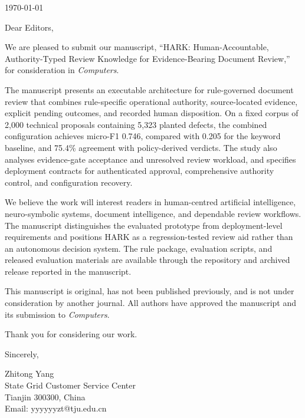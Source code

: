 \documentclass[11pt]{article}
\begin{document}
\thispagestyle{empty}

\today

Dear Editors,

We are pleased to submit our manuscript, ``HARK: Human-Accountable, Authority-Typed Review Knowledge for Evidence-Bearing Document Review,'' for consideration in \emph{Computers}.

The manuscript presents an executable architecture for rule-governed document review that combines rule-specific operational authority, source-located evidence, explicit pending outcomes, and recorded human disposition. On a fixed corpus of 2,000 technical proposals containing 5,323 planted defects, the combined configuration achieves micro-F1 0.746, compared with 0.205 for the keyword baseline, and 75.4\% agreement with policy-derived verdicts. The study also analyses evidence-gate acceptance and unresolved review workload, and specifies deployment contracts for authenticated approval, comprehensive authority control, and configuration recovery.

We believe the work will interest readers in human-centred artificial intelligence, neuro-symbolic systems, document intelligence, and dependable review workflows. The manuscript distinguishes the evaluated prototype from deployment-level requirements and positions HARK as a regression-tested review aid rather than an autonomous decision system. The rule package, evaluation scripts, and released evaluation materials are available through the repository and archived release reported in the manuscript.

This manuscript is original, has not been published previously, and is not under consideration by another journal. All authors have approved the manuscript and its submission to \emph{Computers}.

Thank you for considering our work.

Sincerely,

Zhitong Yang\\
State Grid Customer Service Center\\
Tianjin 300300, China\\
Email: yyyyyyzt@tju.edu.cn
\end{document}
